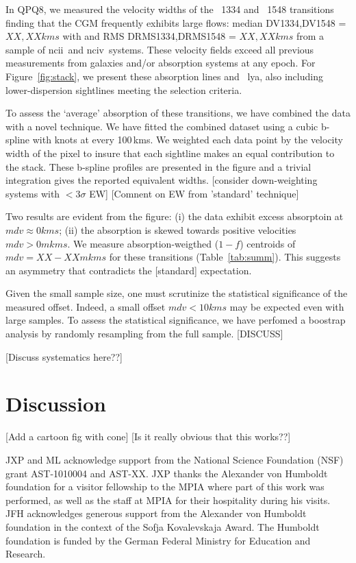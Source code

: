 \documentclass[iop]{emulateapj}
\begin{document}
In QPQ8, we measured the velocity widths of the ~1334
and ~1548 transitions finding that the CGM
frequently exhibits large flows:
median DV{1334},DV{1548} = $XX,XX kms$ with and
RMS DRMS{1334},DRMS{1548} = $XX, XX kms$ from
a sample of ncii\ and nciv\ systems.
These velocity fields exceed all previous measurements from
galaxies and/or absorption systems at any epoch.  For
Figure~\ref{fig:stack}, we present these absorption lines
and ~lya, also including lower-dispersion 
sightlines meeting the selection criteria.

To assess the `average' absorption of these transitions,
we have combined the data with a novel technique.
We have fitted the combined dataset using a cubic b-spline
with knots at every 100\,kms.  We weighted each data
point by the velocity width of the pixel to insure that 
each sightline makes an equal contribution to the stack.
These b-spline profiles are presented in the figure
and a trivial integration gives the reported equivalent
widths.
[consider down-weighting systems with $<3\sigma$ EW]
[Comnent on EW from 'standard' technique]

Two results are evident from the figure:
 (i) the data exhibit excess absorptoin at 
 $mdv \approx 0 kms$;
 (ii) the absorption is skewed towards positive velocities
 $mdv > 0 mkms$.
We measure absorption-weigthed ($1-f$) centroids
of $mdv = XX-XX mkms$ for these transitions
(Table~\ref{tab:summ}).
This suggests an asymmetry that contradicts the [standard]
expectation.  

Given the small sample size, one must 
scrutinize the statistical significance of the measured offset.
Indeed, a small offset $mdv < 10 kms$ may be expected
even with large samples.  To assess the statistical significance,
we have perfomed a boostrap analysis by randomly resampling
from the full sample. [DISCUSS]

[Discuss systematics here??]

\section{Discussion}
\label{sec:discussion}

[Add a cartoon fig with cone]
[Is it really obvious that this works??]


\acknowledgements

JXP and ML acknowledge support from the National
Science Foundation (NSF) grant AST-1010004 and AST-XX. 
JXP thanks the Alexander
von Humboldt foundation for a visitor fellowship to the MPIA where
part of this work was performed, as well as the staff at MPIA for
their hospitality during his visits.
JFH acknowledges generous support from the Alexander von Humboldt
foundation in the context of the Sofja Kovalevskaja Award. The
Humboldt foundation is funded by the German Federal Ministry for
Education and Research.  
\end{document}
